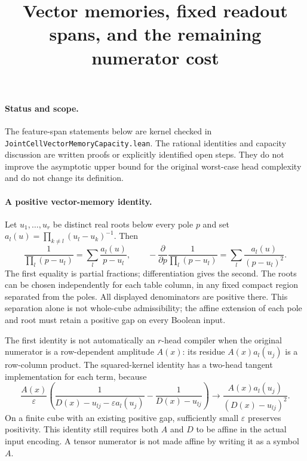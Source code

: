 \documentclass{article}
\begin{document}
\title{Vector memories, fixed readout spans, and the remaining numerator cost}
\maketitle

\paragraph{Status and scope.}
The feature-span statements below are kernel checked in
\texttt{JointCellVectorMemoryCapacity.lean}. The rational identities and
capacity discussion are written proofs or explicitly identified open
steps. They do not improve the asymptotic upper bound for the original
worst-case head complexity and do not change its definition.

\paragraph{A positive vector-memory identity.}
Let $u_1,\ldots,u_r$ be distinct real roots below every pole $p$ and set
$a_l(u)=\prod_{k\ne l}(u_l-u_k)^{-1}$. Then
\[
 \frac1{\prod_l(p-u_l)}=\sum_l\frac{a_l(u)}{p-u_l},
 \qquad
 -\frac{\partial}{\partial p}\frac1{\prod_l(p-u_l)}
   =\sum_l\frac{a_l(u)}{(p-u_l)^2}.
\]
The first equality is partial fractions; differentiation gives the second.
The roots can be chosen independently for each table column, in any fixed
compact region separated from the poles. All displayed denominators are
positive there. This separation alone is not whole-cube admissibility;
the affine extension of each pole and root must retain a positive gap
on every Boolean input.

The first identity is not automatically an $r$-head compiler when the
original numerator is a row-dependent amplitude $A(x)$: its residue
$A(x)a_l(u_j)$ is a row-column product. The squared-kernel identity has
a two-head tangent implementation for each term, because
\[
 \frac{A(x)}{\varepsilon}
 \left(\frac1{D(x)-u_{lj}-\varepsilon a_l(u_j)}
             -\frac1{D(x)-u_{lj}}\right)
 \longrightarrow
 \frac{A(x)a_l(u_j)}{(D(x)-u_{lj})^2}.
\]
On a finite cube with an existing positive gap, sufficiently small
$\varepsilon$ preserves positivity. This identity still requires both
$A$ and $D$ to be affine in the actual input encoding. A tensor numerator
is not made affine by writing it as a symbol $A$.
\end{document}

